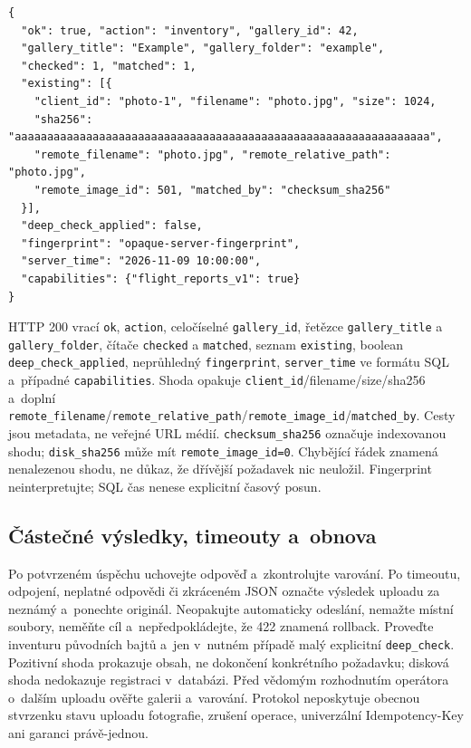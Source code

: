 \documentclass[11pt,a4paper]{article}
\newcommand{\codeword}[1]{\nolinkurl{#1}}
\begin{document}
\begin{lstlisting}[language={}]
{
  "ok": true, "action": "inventory", "gallery_id": 42,
  "gallery_title": "Example", "gallery_folder": "example",
  "checked": 1, "matched": 1,
  "existing": [{
    "client_id": "photo-1", "filename": "photo.jpg", "size": 1024,
    "sha256": "aaaaaaaaaaaaaaaaaaaaaaaaaaaaaaaaaaaaaaaaaaaaaaaaaaaaaaaaaaaaaaaa",
    "remote_filename": "photo.jpg", "remote_relative_path": "photo.jpg",
    "remote_image_id": 501, "matched_by": "checksum_sha256"
  }],
  "deep_check_applied": false,
  "fingerprint": "opaque-server-fingerprint",
  "server_time": "2026-11-09 10:00:00",
  "capabilities": {"flight_reports_v1": true}
}
\end{lstlisting}

HTTP 200 vrací \codeword{ok}, \codeword{action}, celočíselné \codeword{gallery_id}, řetězce
\codeword{gallery_title} a \codeword{gallery_folder}, čítače \codeword{checked} a
\codeword{matched}, seznam \codeword{existing}, boolean \codeword{deep_check_applied},
neprůhledný \codeword{fingerprint}, \codeword{server_time} ve formátu SQL a~případné
\codeword{capabilities}. Shoda opakuje \codeword{client_id}/filename/size/sha256 a~doplní
\codeword{remote_filename}/\codeword{remote_relative_path}/\codeword{remote_image_id}/\codeword{matched_by}.
Cesty jsou metadata, ne veřejné URL médií. \codeword{checksum_sha256} označuje indexovanou
shodu; \codeword{disk_sha256} může mít \codeword{remote_image_id=0}. Chybějící řádek znamená
nenalezenou shodu, ne důkaz, že dřívější požadavek nic neuložil. Fingerprint
neinterpretujte; SQL čas nenese explicitní časový posun.

\subsection{\texorpdfstring{Částečné výsledky, timeouty a~obnova}{Částečné výsledky, timeouty a obnova}}

\label{api352:recovery}

Po potvrzeném úspěchu uchovejte odpověď a~zkontrolujte varování. Po timeoutu, odpojení,
neplatné odpovědi či zkráceném JSON označte výsledek uploadu za neznámý a~ponechte originál.
Neopakujte automaticky odeslání, nemažte místní soubory, neměňte cíl a~nepředpokládejte, že
422 znamená rollback. Proveďte inventuru původních bajtů a~jen v~nutném případě malý
explicitní \codeword{deep_check}. Pozitivní shoda prokazuje obsah, ne dokončení konkrétního
požadavku; disková shoda nedokazuje registraci v~databázi. Před vědomým rozhodnutím
operátora o~dalším uploadu ověřte galerii a~varování. Protokol neposkytuje obecnou stvrzenku
stavu uploadu fotografie, zrušení operace, univerzální Idempotency-Key ani garanci
právě-jednou.
\end{document}
